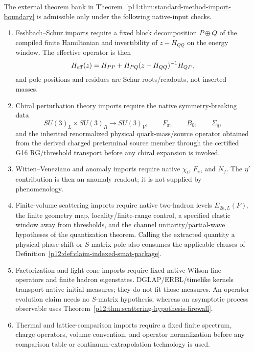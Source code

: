\documentclass[12pt,a4paper]{article}
\begin{document}
\begin{proposition}
\label{p11:prop:hypothesis-audit-standard-imports}
The external theorem bank in Theorem~\ref{p11:thm:standard-method-import-boundary} is admissible only under the following native-input checks.
\begin{enumerate}[label=(\alph*), leftmargin=2.2em]
\item Feshbach--Schur imports require a fixed block decomposition \(P\oplus Q\) of the compiled finite Hamiltonian and invertibility of \(z-H_{QQ}\) on the energy window.  The effective operator is then
\[
H_{\rm eff}(z)=H_{PP}+H_{PQ}(z-H_{QQ})^{-1}H_{QP},
\]
and pole positions and residues are Schur roots/readouts, not inserted masses.
\item Chiral perturbation theory imports require the native symmetry-breaking data
\[
SU(3)_L\times SU(3)_R\to SU(3)_V,
\qquad F_\pi,
\qquad B_0,
\qquad \Sigma_q,
\]
and the inherited renormalized physical quark-mass/source operator obtained from the derived charged preterminal source member through the certified G16 RG/threshold transport before any chiral expansion is invoked.
\item Witten--Veneziano and anomaly imports require native \(\chi_t\), \(F_\pi\), and \(N_f\).  The \(\eta'\) contribution is then an anomaly readout; it is not supplied by phenomenology.
\item Finite-volume scattering imports require native two-hadron levels
      \(E_{2h,L}(P)\), the finite geometry map, locality/finite-range control,
      a specified elastic window away from thresholds, and the channel
      unitarity/partial-wave hypotheses of the quantization theorem.  Calling
      the extracted quantity a physical phase shift or \(S\)-matrix pole also
      consumes the applicable clauses of
      Definition~\ref{p12:def:claim-indexed-smat-package}.
\item Factorization and light-cone imports require fixed native Wilson-line
      operators and finite hadron eigenstates.  DGLAP/ERBL/timelike kernels
      transport native initial measures; they do not fit those measures.  An
      operator evolution claim needs no \(S\)-matrix hypothesis, whereas an
      asymptotic process observable uses
      Theorem~\ref{p12:thm:scattering-hypothesis-firewall}.
\item Thermal and lattice-comparison imports require a fixed finite spectrum, charge operators, volume convention, and operator normalization before any comparison table or continuum-extrapolation technology is used.
\end{enumerate}
\end{proposition}
\end{document}
